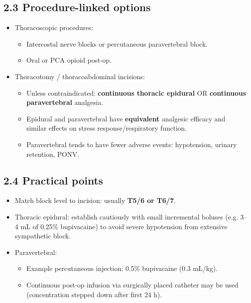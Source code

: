 \documentclass[11pt,a4paper]{article}
\begin{document}
\subsection{2.3 Procedure-linked options}
\begin{itemize}[leftmargin=*, itemsep=2pt]
  \item Thoracoscopic procedures:
  \begin{itemize}[leftmargin=*, itemsep=2pt]
    \item Intercostal nerve blocks or percutaneous paravertebral block.
    \item Oral or PCA opioid post-op.
  \end{itemize}
  \item Thoracotomy / thoracoabdominal incisions:
  \begin{itemize}[leftmargin=*, itemsep=2pt]
    \item Unless contraindicated: \textbf{continuous thoracic epidural} OR \textbf{continuous paravertebral} analgesia.
    \item Epidural and paravertebral have \textbf{equivalent} analgesic efficacy and similar effects on stress response/respiratory function.
    \item Paravertebral tends to have fewer adverse events: hypotension, urinary retention, PONV.
  \end{itemize}
\end{itemize}

\subsection{2.4 Practical points}
\begin{itemize}[leftmargin=*, itemsep=2pt]
  \item Match block level to incision: usually \textbf{T5/6 or T6/7}.
  \item Thoracic epidural: establish cautiously with small incremental boluses (e.g. 3--4 mL of 0.25\% bupivacaine) to avoid severe hypotension from extensive sympathetic block.
  \item Paravertebral:
  \begin{itemize}[leftmargin=*, itemsep=2pt]
    \item Example percutaneous injection: 0.5\% bupivacaine (0.3 mL/kg).
    \item Continuous post-op infusion via surgically placed catheter may be used (concentration stepped down after first 24 h).
  \end{itemize}
\end{itemize}
\end{document}
